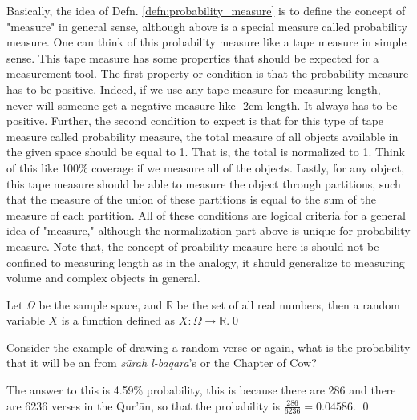 Basically, the idea of Defn. \ref{defn:probability_measure} is to define the concept of "measure" in general sense, although above is a special measure called probability measure. One can think of this probability measure like a tape measure in simple sense. This tape measure has some properties that should be expected for a measurement tool. The first property or condition is that the probability measure has to be positive. Indeed, if we use any tape measure for measuring length, never will someone get a negative measure like -2cm length. It always has to be positive. Further, the second condition to expect is that for this type of tape measure called probability measure, the total measure of all objects available in the given space should be equal to 1. That is, the total is normalized to 1. Think of this like 100\% coverage if we measure all of the objects. Lastly, for any object, this tape measure should be able to measure the object through partitions, such that the measure of the union of these partitions is equal to the sum of the measure of each partition. All of these conditions are logical criteria for a general idea of "measure," although the normalization part above is unique for probability measure. Note that, the concept of proability measure here is should not be confined to measuring length as in the analogy, it should generalize to measuring volume and complex objects in general.
\begin{defnx}
Let $\Omega$ be the sample space, and $\mathbb{R}$ be the set of all real numbers, then a random variable $X$ is a function defined as $X:\Omega\rightarrow\mathbb{R}$.\qed
\end{defnx}
\begin{exmpx}\label{ex:ayah_prob}
Consider the example of drawing a random verse or   again, what is the probability that it will be an   from \textit{s\=urah l-baqara}'s   or the Chapter of Cow?

The answer to this is 4.59\% probability, this is because there are 286   and there are 6236 verses in the Qur'\=an, so that the probability is $\frac{286}{6236}=0.04586$.
\qed
\end{exmpx}
